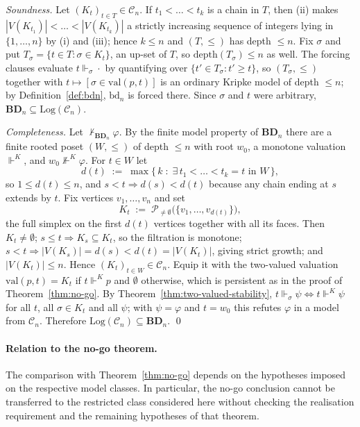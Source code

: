 \documentclass[final,12pt]{elsarticle}
\theoremstyle{plain}
\theoremstyle{definition}
\begin{document}
\proof
\emph{Soundness.}  Let \((K_t)_{t\in T}\in\mathcal{C}_n\).  If
\(t_1<\dots<t_{k}\) is a chain in \(T\), then (ii) makes
\(|V(K_{t_1})|<\dots<|V(K_{t_k})|\) a strictly increasing sequence of integers
lying in \(\{1,\dots,n\}\) by (i) and (iii); hence \(k\le n\) and \((T,\le)\)
has depth \(\le n\).  Fix \(\sigma\) and put
\(T_\sigma=\{t\in T:\sigma\in K_t\}\), an up-set of \(T\), so
\(\mathrm{depth}(T_\sigma)\le n\) as well.  The forcing clauses evaluate
\(t\Vdash_\sigma\cdot\) by quantifying over \(\{t'\in T_\sigma: t'\ge t\}\), so
\((T_\sigma,\le)\) together with \(t\mapsto[\sigma\in\mathrm{val}(p,t)]\) is an
ordinary Kripke model of depth \(\le n\); by
Definition~\ref{def:bdn}, \(\mathrm{bd}_n\) is forced there.  Since
\(\sigma\) and \(t\) were arbitrary, \(\mathbf{BD}_n\subseteq
\mathrm{Log}(\mathcal{C}_n)\).

\emph{Completeness.}  Let \(\nvdash_{\mathbf{BD}_n}\varphi\).  By the finite
model property of \(\mathbf{BD}_n\) there are a finite rooted poset
\((W,\le)\) of depth \(\le n\) with root \(w_0\), a monotone valuation
\(\Vdash^{K}\), and \(w_0\nVdash^{K}\varphi\).  For \(t\in W\) let
\[
  d(t)\;:=\;\max\{\,k \;:\; \exists\, t_1<\dots<t_k=t \text{ in } W\,\},
\]
so \(1\le d(t)\le n\), and \(s<t \Rightarrow d(s)<d(t)\) because any chain
ending at \(s\) extends by \(t\).  Fix vertices \(v_1,\dots,v_n\) and set
\[
  K_t \;:=\; \mathcal{P}_{\neq\emptyset}\bigl(\{v_1,\dots,v_{d(t)}\}\bigr),
\]
the full simplex on the first \(d(t)\) vertices together with all its faces.
Then \(K_t\neq\emptyset\); \(s\le t\Rightarrow K_s\subseteq K_t\), so the
filtration is monotone; \(s<t\Rightarrow |V(K_s)|=d(s)<d(t)=|V(K_t)|\), giving
strict growth; and \(|V(K_t)|\le n\).  Hence
\((K_t)_{t\in W}\in\mathcal{C}_n\).  Equip it with the two-valued valuation
\(\mathrm{val}(p,t)=K_t\) if \(t\Vdash^{K}p\) and \(\emptyset\) otherwise,
which is persistent as in the proof of Theorem~\ref{thm:no-go}.  By
Theorem~\ref{thm:two-valued-stability}, \(t\Vdash_\sigma\psi\iff
t\Vdash^{K}\psi\) for all \(t\), all \(\sigma\in K_t\) and all \(\psi\); with
\(\psi=\varphi\) and \(t=w_0\) this refutes \(\varphi\) in a model from
\(\mathcal{C}_n\).  Therefore
\(\mathrm{Log}(\mathcal{C}_n)\subseteq\mathbf{BD}_n\).
\qed

\paragraph{Relation to the no-go theorem.}
The comparison with Theorem~\ref{thm:no-go} depends on the hypotheses
imposed on the respective model classes. In particular, the no-go conclusion
cannot be transferred to the restricted class considered here without checking
the realisation requirement and the remaining hypotheses of that theorem.
\end{document}
